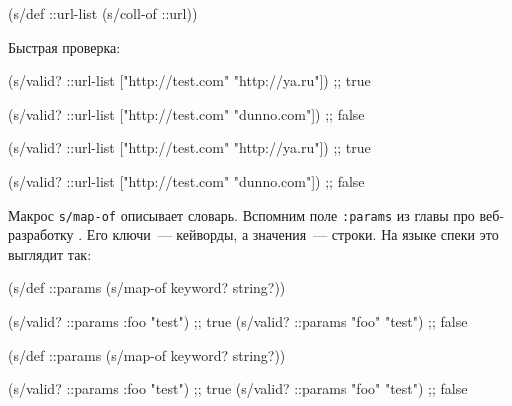 \begin{english}
  \begin{clojure}
(s/def ::url-list (s/coll-of ::url))
  \end{clojure}
\end{english}

\noindent
Быстрая проверка:

\ifx\DEVICETYPE\MOBILE

\begin{english}
  \begin{clojure}
(s/valid? ::url-list
  ["http://test.com" "http://ya.ru"])
;; true

(s/valid? ::url-list
  ["http://test.com" "dunno.com"])
;; false
  \end{clojure}
\end{english}

\else

\begin{english}
  \begin{clojure}
(s/valid? ::url-list ["http://test.com" "http://ya.ru"])
;; true

(s/valid? ::url-list ["http://test.com" "dunno.com"])
;; false
  \end{clojure}
\end{english}

\fi


Макрос \verb|s/map-of| описывает словарь. Вспомним поле \verb|:params| из
главы про веб-разработку . Его ключи~--- кейворды, а значения~---
строки. На языке спеки это выглядит так:

\ifx\DEVICETYPE\MOBILE

\begin{english}
  \begin{clojure}
(s/def ::params
  (s/map-of keyword? string?))

(s/valid? ::params
  {:foo "test"})  ;; true
(s/valid? ::params
  {"foo" "test"}) ;; false
  \end{clojure}
\end{english}

\else

\begin{english}
  \begin{clojure}
(s/def ::params
  (s/map-of keyword? string?))

(s/valid? ::params {:foo "test"})  ;; true
(s/valid? ::params {"foo" "test"}) ;; false
  \end{clojure}
\end{english}

